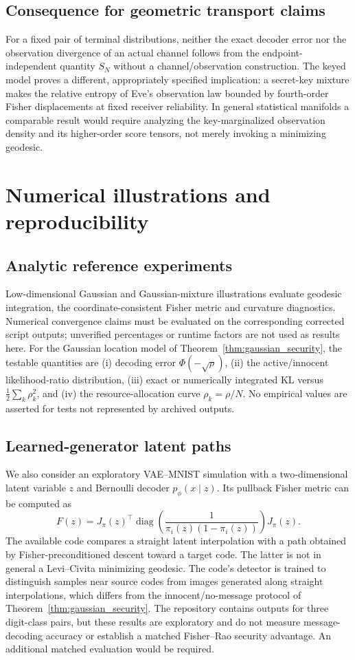 \documentclass[preprint,12pt]{elsarticle}
\newcommand{\PhiN}{\Phi}
\begin{document}
\subsection{Consequence for geometric transport claims}
For a fixed pair of terminal distributions, neither
the exact decoder error nor the observation
divergence of an actual channel follows from the
endpoint-independent quantity $S_N$ without
a channel/observation construction.
The keyed model proves a different, appropriately
specified implication: a secret-key mixture makes
the relative entropy of Eve's observation law
bounded by fourth-order Fisher displacements
at fixed receiver reliability.
In general statistical manifolds a comparable
result would require analyzing the
key-marginalized observation density and
its higher-order score tensors, not merely
invoking a minimizing geodesic.


\section{Numerical illustrations and reproducibility}
\label{sec:experiments}
\subsection{Analytic reference experiments}
Low-dimensional Gaussian and Gaussian-mixture
illustrations evaluate geodesic integration, the
coordinate-consistent Fisher metric and curvature
diagnostics. Numerical convergence claims must
be evaluated on the corresponding corrected
script outputs; unverified percentages or
runtime factors are not used as results here.
For the Gaussian location model of
Theorem~\ref{thm:gaussian_security}, the
testable quantities are (i) decoding error
$\PhiN(-\sqrt\rho)$, (ii) the active/innocent
likelihood-ratio distribution, (iii) exact or
numerically integrated KL versus
$\frac12\sum_k\rho_k^2$, and (iv) the
resource-allocation curve $\rho_k=\rho/N$.
No empirical values are asserted for tests
not represented by archived outputs.


\subsection{Learned-generator latent paths}
We also consider an exploratory VAE--MNIST
simulation with a two-dimensional latent
variable $z$ and Bernoulli decoder
$p_\phi(x\mid z)$. Its pullback Fisher
metric can be computed as
\[
F(z)=J_\pi(z)^\top\!
\operatorname{diag}\left(
\frac1{\pi_i(z)(1-\pi_i(z))}
\right)J_\pi(z).
\]
The available code compares a straight latent
interpolation with a path obtained by
Fisher-preconditioned descent toward a
target code. The latter is not in general a
Levi--Civita minimizing geodesic.
The code's detector is trained to distinguish
samples near source codes from images generated
along straight interpolations, which differs
from the innocent/no-message protocol of
Theorem~\ref{thm:gaussian_security}.
The repository contains outputs for three
digit-class pairs, but these results are
exploratory and do not measure message-decoding
accuracy or establish a matched Fisher--Rao
security advantage. An additional matched
evaluation would be required.
\end{document}

